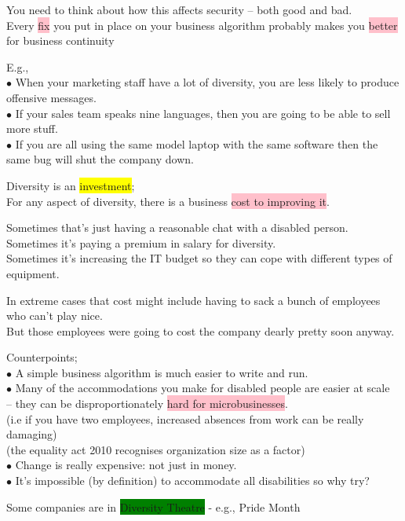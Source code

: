 \documentclass[tikz,border=10pt]{project_plan}
\newcommand{\bulletPoint}{\hspace{-3.1pt}$\bullet$ \hspace{5pt}}
\begin{document}
You need to think about how this affects security – both good and bad. \\
Every \colorbox{pink}{fix} you put in place on your business algorithm probably makes you \colorbox{pink}{better} for business continuity

E.g.,\\
\bulletPoint When your marketing staff have a lot of diversity, you are less likely to produce offensive messages.  \\
\bulletPoint If your sales team speaks nine languages, then you are going to be able to sell more stuff.\\
\bulletPoint If you are all using the same model laptop with the same software then the same bug will shut the company down.

Diversity is an \colorbox{yellow}{investment};\\
For any aspect of diversity, there is a business \colorbox{pink}{cost to improving it}.

Sometimes that’s just having a reasonable chat with a disabled person.\\
Sometimes it’s paying a premium in salary for diversity.\\
Sometimes it’s increasing the IT budget so they can cope with different types of equipment.

In extreme cases that cost might include having to sack a bunch of employees who can’t play nice. \\
But those employees were going to cost the company dearly pretty soon anyway.

Counterpoints;\\
\bulletPoint A simple business algorithm is much easier to write and run. \\
\bulletPoint Many of the accommodations you make for disabled people are easier at scale\\
– they can be disproportionately \colorbox{pink}{hard for microbusinesses}. \\
(i.e if you have two employees, increased absences from work can be really damaging)  \\
(the equality act 2010 recognises organization size as a factor) \\
\bulletPoint Change is really expensive: not just in money. \\
\bulletPoint It’s impossible (by definition) to accommodate all disabilities so why try?

Some companies are in \colorbox{green}{Diversity Theatre} - e.g., Pride Month
\end{document}
